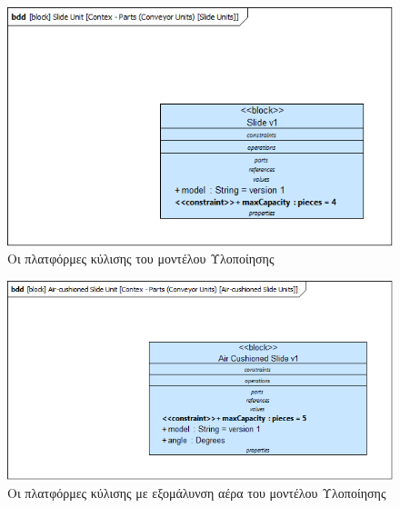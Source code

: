 \documentclass[a4paper,12pt,twoside]{report}
\begin{document}
\begin{appendices}
				\begin{figure}[hp]
					\centering
					\includegraphics[scale=0.50]{DesignModel_Contex-Parts(ConveyorUnits)[SlideUnits].png}
					\caption{Οι πλατφόρμες κύλισης του μοντέλου Υλοποίησης}
					\label{φωτ:Οι πλατφόρμες κύλισης του μοντέλου Υλοποίησης}
				\end{figure}
				
				\begin{figure}[hp]
					\centering
					\includegraphics[scale=0.50]{DesignModel_Contex-Parts(ConveyorUnits)[Air-cushionedSlideUnits].png}
					\caption{Οι πλατφόρμες κύλισης με εξομάλυνση αέρα του μοντέλου Υλοποίησης}
					\label{φωτ:Οι πλατφόρμες κύλισης  με εξομάλυνση αέρα του μοντέλου Υλοποίησης}
				\end{figure}
				

\end{appendices}
\end{document}
